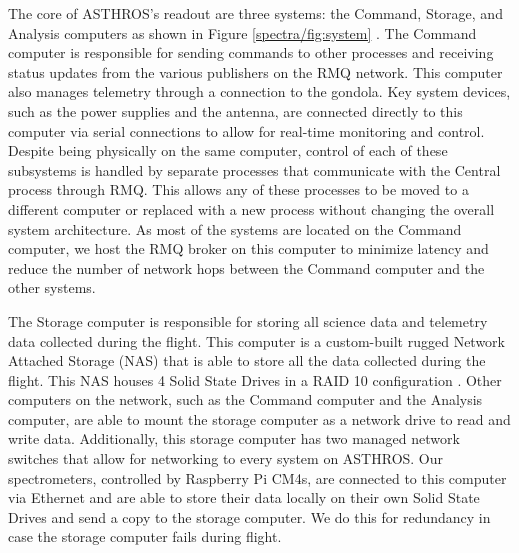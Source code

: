 The core of ASTHROS's readout are three systems: the Command, Storage, and Analysis computers as shown in Figure \ref{spectra/fig:system} \parencite{horton2024readout}.
The Command computer is responsible for sending commands to other processes and receiving status updates from the various publishers on the RMQ network. 
This computer also manages telemetry through a connection to the gondola. 
Key system devices, such as the power supplies and the antenna, are connected directly to this computer via serial connections to allow for real-time monitoring and control.
Despite being physically on the same computer, control of each of these subsystems is handled by separate processes that communicate with the Central process through RMQ.
This allows any of these processes to be moved to a different computer or replaced with a new process without changing the overall system architecture.
As most of the systems are located on the Command computer, we host the RMQ broker on this computer to minimize latency and reduce the number of network hops between the Command computer and the other systems.

The Storage computer is responsible for storing all science data and telemetry data collected during the flight.
This computer is a custom-built rugged Network Attached Storage (NAS) that is able to store all the data collected during the flight.
This NAS houses 4 Solid State Drives in a RAID 10 configuration \parencite{chen1994raid}.
Other computers on the network, such as the Command computer and the Analysis computer, are able to mount the storage computer as a network drive to read and write data.
Additionally, this storage computer has two managed network switches that allow for networking to every system on ASTHROS.
Our spectrometers, controlled by Raspberry Pi CM4s, are connected to this computer via Ethernet and are able to store their data locally on their own Solid State Drives and send a copy to the storage computer.
We do this for redundancy in case the storage computer fails during flight.

